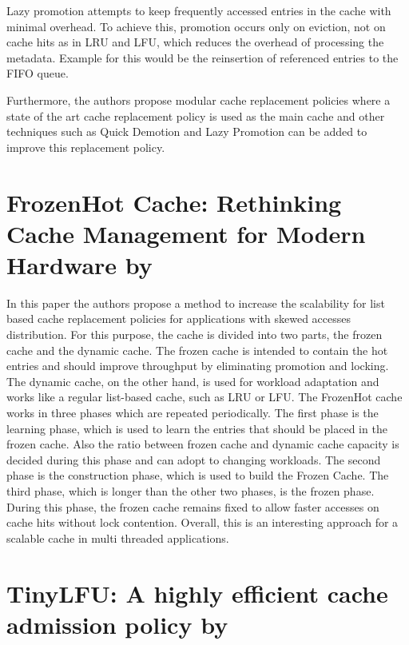 \documentclass[
	12pt,
	a4paper,
	abstract,
	bibliography=totoc,
	chapterprefix,
	headings=openright,
	numbers=endperiod,
	parskip=half,
	twoside,
]{scrreprt}
\begin{document}
Lazy promotion attempts to keep frequently accessed entries in the cache with minimal overhead.
To achieve this, promotion occurs only on eviction, not on cache hits as in LRU and LFU, 
which reduces the overhead of processing the metadata.
Example for this would be the reinsertion of referenced entries to the FIFO queue.

Furthermore, the authors propose modular cache replacement policies where a state of the art cache replacement 
policy is used as the main cache and  other techniques such as Quick Demotion and Lazy Promotion 
can be added to improve this replacement policy.

\section*{FrozenHot Cache: Rethinking Cache Management for Modern Hardware by \cite{qiu2023frozenhot}}

In this paper the authors propose a method to increase the 
scalability for list based cache replacement policies for applications with skewed accesses distribution.
For this purpose, the cache is divided into two parts, the frozen cache and the dynamic cache.
The frozen cache is intended to contain the hot entries and should improve throughput by eliminating promotion and locking.
The dynamic cache, on the other hand, is used for workload adaptation 
and works like a regular list-based cache, such as LRU or LFU.
The FrozenHot cache works in three phases which are repeated periodically.
The first phase is the learning phase, which is used to learn the entries that should be placed in the frozen cache.
Also the ratio between frozen cache and dynamic cache capacity is decided during this phase and 
can adopt to changing workloads.
The second phase is the construction phase, which is used to build the Frozen Cache.
The third phase, which is longer than the other two phases, is the frozen phase.
During this phase, the frozen cache remains fixed to allow faster accesses on cache hits without lock contention.
Overall, this is an interesting approach for a scalable cache in multi threaded applications.


\section*{TinyLFU: A highly efficient cache admission policy by \cite{einziger2017tinylfu}}
\end{document}
